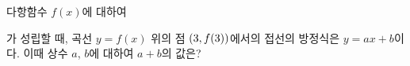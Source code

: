 다항함수 $f(x)$에 대하여 \par\smallskip{}\par\smallskip\noindent 가 성립할 때, 곡선 $y=f(x)$ 위의 점 $(3{,}\mkern3mu\mathopen{}f(3))$에서의 접선의 방정식은 $y=ax+b$이다. 이때 상수 $a$, $b$에 대하여 $a+b$의 값은?

